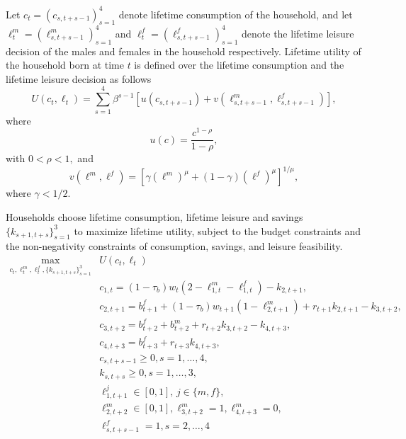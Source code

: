 \documentclass[BufferStockTheory]{subfiles}
\begin{document}
 Let $c_t=(c_{s,t+s-1})_{s=1}^4$ denote lifetime consumption of the household, and let $\ell_t^m=(\ell_{s,t+s-1}^m)_{s=1}^4$ and $\ell_t^f=(\ell_{s,t+s-1}^f)_{s=1}^4$ denote the lifetime leisure decision of the males and females in the household respectively. Lifetime utility of the household born at time $t$ is defined over the lifetime consumption and the lifetime leisure decision as follows
 \begin{equation}
 	\label{eq:periodU}
 	U(c_t,\ell_t)=\sum_{s=1}^4 \beta^{s-1} \left[ u(c_{s,t+s-1}) + v(\ell_{s,t+s-1}^m,\ell_{s,t+s-1}^f) \right],
 \end{equation}
 where 
 \begin{equation}
 	\label{eq:CRRA}
 	u(c)=\frac{c^{1-\rho}}{1-\rho},
 \end{equation}
 with $0<\rho<1,$ and 
 \begin{equation}
 	\label{eq:utilleisure}
 	v(\ell^m,\ell^f)=\left[\gamma (\ell^m)^\mu +(1-\gamma)(\ell^f)^\mu\right]^{1/\mu},
 \end{equation}
 where $\gamma<1/2.$

Households choose lifetime consumption, lifetime leisure and savings $\{k_{s+1,t+s}\}_{s=1}^3$ to maximize lifetime utility, subject to the budget constraints and the non-negativity constraints of consumption, savings, and leisure feasibility. 
\begin{equation}
\label{eq:household-maximization}
	\begin{aligned}	
		\max_{c_t,\ell_t^m,\ell_t^f,\{k_{s+1,t+s}\}_{s=1}^3} & U(c_t,\ell_t) \\
	&c_{1,t}   = (1-\tau_b)w_t (2-\ell_{1,t}^m - \ell_{1,t}^f) -k_{2,t+1} ,\\
 	&c_{2,t+1}   = b_{t+1}^f+(1-\tau_b)w_{t+1} (1-\ell_{2,t+1}^m ) + r_{t+1}k_{2,t+1} -k_{3,t+2}  ,\\
 	&c_{3,t+2}   = b_{t+2}^f+ b_{t+2}^m  + r_{t+2}k_{3,t+2} -k_{4,t+3}  ,\\
 	&c_{4,t+3}  = b_{t+3}^f + r_{t+3}k_{4,t+3} ,\\
 	&c_{s,t+s-1}\geq 0, s=1,\ldots,4,\\
    &k_{s,t+s}\geq 0, s=1,\ldots,3,\\
    &\ell_{1,t+1}^j\in [0,1],\, j\in\{m,f\},\\
    &\ell_{2,t+2}^m\in[0,1], \ell_{3,t+2}^m=1,\ell_{4,t+3}^m=0,\\
    &\ell_{s,t+s-1}^f=1,s=2,\ldots,4\\
	\end{aligned}	
\end{equation}
\end{document}
